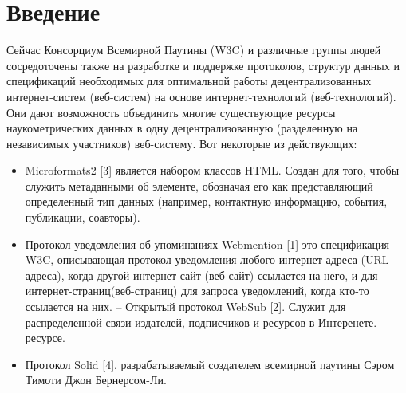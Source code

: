 \hypertarget{ux432ux432ux435ux434ux435ux43dux438ux435}{%
\section{Введение}\label{ux432ux432ux435ux434ux435ux43dux438ux435}}

Сейчас Консорциум Всемирной Паутины (W3C) и различные группы людей
сосредоточены также на разработке и поддержке протоколов, структур
данных и спецификаций необходимых для оптимальной работы
децентрализованных интернет-систем (веб-систем) на основе
интернет-технологий (веб-технологий). Они дают возможность объединить
многие существующие ресурсы наукометрических данных в одну
децентрализованную (разделенную на независимых участников) веб-систему.
Вот некоторые из действующих:

\begin{itemize}
\tightlist
\item
  Microformats2 {[}3{]} является набором классов HTML. Создан для того,
  чтобы служить метаданными об элементе, обозначая его как
  представляющий определенный тип данных (например, контактную
  информацию, события, публикации, соавторы).
\item
  Протокол уведомления об упоминаниях Webmention {[}1{]} это
  спецификация W3C, описывающая протокол уведомления любого
  интернет-адреса (URL-адреса), когда другой интернет-сайт (веб-сайт)
  ссылается на него, и для интернет-страниц(веб-страниц) для запроса
  уведомлений, когда кто-то ссылается на них. -- Открытый протокол
  WebSub {[}2{]}. Служит для распределенной связи издателей, подписчиков
  и ресурсов в Интеренете. ресурсе.
\item
  Протокол Solid {[}4{]}, разрабатываемый создателем всемирной паутины
  Сэром Тимоти Джон Бернерсом-Ли.
\end{itemize}

